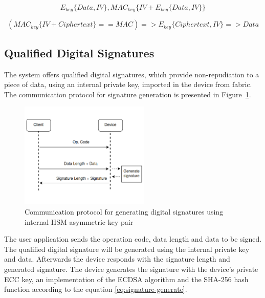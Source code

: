 \begin{equation}
	\label{eq:encrypt-mac}
	E_{key}\{Data, IV\}, MAC_{key}\{IV+E_{key}\{Data, IV\}\}
\end{equation}

\begin{equation}
	\label{eq:decrypt-mac}
	(MAC_{key}\{IV+Ciphertext\} == MAC) => E_{key}\{Ciphertext, IV\} => Data
\end{equation}


\subsection{Qualified Digital Signatures}\label{chap:arch:services:signatures}

The system offers qualified digital signatures, which provide non-repudiation to a piece of data, using an internal private key, imported in the device from fabric.
The communication protocol for signature generation is presented in Figure~\ref{fig:protocol:signature-generate}.
\begin{figure}[h!]
	\centering
	\includegraphics[width=0.55\textwidth]{./Images/signature-generate.png}
	\caption{Communication protocol for generating digital signatures using internal HSM asymmetric key pair}
	\label{fig:protocol:signature-generate}
\end{figure}
The user application sends the operation code, data length and data to be signed.
The qualified digital signature will be generated using the internal private key and data. Afterwards the device responds with the signature length and generated signature.
The device generates the signature with the device's private ECC key, an implementation of the \ac{ECDSA} algorithm and the SHA-256 hash function according to the equation \ref{eq:signature-generate}.

